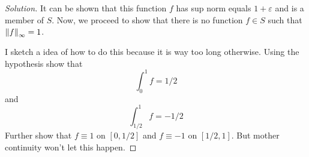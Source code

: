 \begin{proof}[Solution]
It can be shown that this function $f$ has sup norm equals $1+\varepsilon$ and is a member of $S$.
Now, we proceed to show  that there is no function $f \in S$ such that $\left\lVert f \right\rVert_{\infty} = 1$.

I sketch a idea of how to do this because it is way too long otherwise. Using the hypothesis show that 
\begin{equation*}
    \int_{0}^{1} f = 1/2
\end{equation*}
and 
\begin{equation*}
    \int_{1/2}^{1} f = -1/2
\end{equation*}
Further show that $f\equiv 1$ on $[0,1/2]$ and $f\equiv -1$ on $[1/2,1]$. But mother continuity won't let this happen.
\end{proof}
